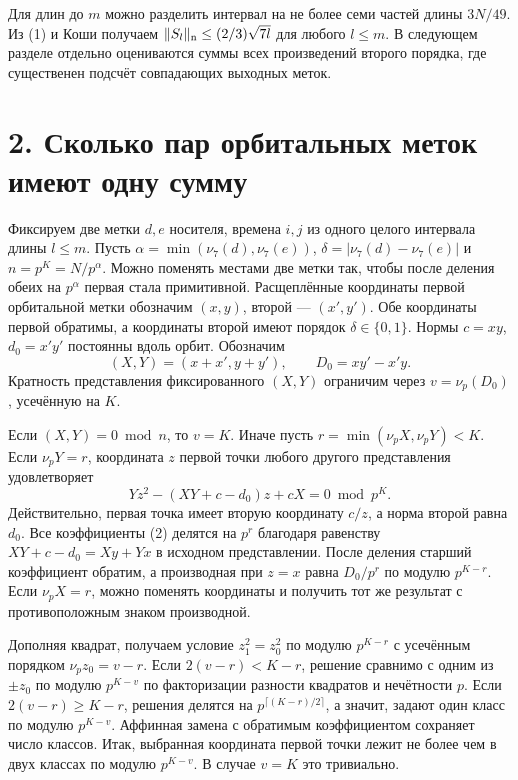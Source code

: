\documentclass[11pt,a4paper]{article}
\newcommand{\sect}[1]{\section*{\sffamily\color{ink}#1}}
\begin{document}
Для длин до $m$ можно разделить интервал на не более семи частей длины $3N/49$. Из (1) и Коши получаем $\|S_l\|_{\rm n}\le(2/3)\sqrt{7l}$ для любого $l\le m$. В следующем разделе отдельно оцениваются суммы всех произведений второго порядка, где существенен подсчёт совпадающих выходных меток.
\newpage
\sect{2. Сколько пар орбитальных меток имеют одну сумму}
Фиксируем две метки $d,e$ носителя, времена $i,j$ из одного целого интервала длины $l\le m$. Пусть $\alpha=\min(\nu_7(d),\nu_7(e))$, $\delta=|\nu_7(d)-\nu_7(e)|$ и $n=p^K=N/p^\alpha$. Можно поменять местами две метки так, чтобы после деления обеих на $p^\alpha$ первая стала примитивной. Расщеплённые координаты первой орбитальной метки обозначим $(x,y)$, второй --- $(x',y')$. Обе координаты первой обратимы, а координаты второй имеют порядок $\delta\in\{0,1\}$. Нормы $c=xy$, $d_0=x'y'$ постоянны вдоль орбит. Обозначим
\[
               (X,Y)=(x+x',y+y'),\qquad D_0=xy'-x'y .
\]
Кратность представления фиксированного $(X,Y)$ ограничим через $v=\nu_p(D_0)$, усечённую на $K$.

Если $(X,Y)=0\bmod n$, то $v=K$. Иначе пусть $r=\min(\nu_p X,\nu_p Y)<K$. Если $\nu_p Y=r$, координата $z$ первой точки любого другого представления удовлетворяет
\[
        Y z^2-(XY+c-d_0)z+cX=0\bmod p^K.                            \tag{2}
\]
Действительно, первая точка имеет вторую координату $c/z$, а норма второй равна $d_0$. Все коэффициенты (2) делятся на $p^r$ благодаря равенству $XY+c-d_0=Xy+Yx$ в исходном представлении. После деления старший коэффициент обратим, а производная при $z=x$ равна $D_0/p^r$ по модулю $p^{K-r}$. Если $\nu_p X=r$, можно поменять координаты и получить тот же результат с противоположным знаком производной.

Дополняя квадрат, получаем условие $z_1^2=z_0^2$ по модулю $p^{K-r}$ с усечённым порядком $\nu_p z_0=v-r$. Если $2(v-r)<K-r$, решение сравнимо с одним из $\pm z_0$ по модулю $p^{K-v}$ по факторизации разности квадратов и нечётности $p$. Если $2(v-r)\ge K-r$, решения делятся на $p^{\lceil(K-r)/2\rceil}$, а значит, задают один класс по модулю $p^{K-v}$. Аффинная замена с обратимым коэффициентом сохраняет число классов. Итак, выбранная координата первой точки лежит не более чем в двух классах по модулю $p^{K-v}$. В случае $v=K$ это тривиально.
\end{document}
